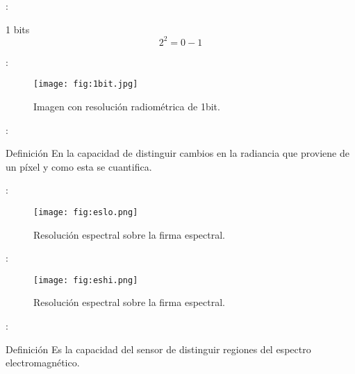 
\begin{frame}{\secname : \subsecname}
  \begin{block}{1 bits}
   \begin{equation}
            2^2 = 0-1
        \end{equation}
  \end{block}
\end{frame} 


\begin{frame}{\secname : \subsecname}
  \begin{figure}
    \centering
    \texttt{[image: fig:1bit.jpg]}
    \caption{Imagen con resolución radiométrica de 1bit.}
    \label{}
  \end{figure}
\end{frame}



\begin{frame}{\secname : \subsecname}
    \begin{block}{Definición}
        En la capacidad de distinguir cambios en la radiancia que proviene de un píxel y como esta se cuantifica.
    \end{block}
\end{frame}

\begin{frame}{\secname : \subsecname}
  \begin{figure}
    \centering
    \texttt{[image: fig:eslo.png]}
    \caption{Resolución espectral sobre la firma espectral.}
    \label{}
  \end{figure}
\end{frame}

\begin{frame}{\secname : \subsecname}
  \begin{figure}
    \centering
    \texttt{[image: fig:eshi.png]}
    \caption{Resolución espectral sobre la firma espectral.}
    \label{}
  \end{figure}
\end{frame}

\begin{frame}{\secname : \subsecname}
    \begin{block}{Definición}
        Es la capacidad del sensor de distinguir regiones del espectro electromagnético.
    \end{block}
\end{frame}

